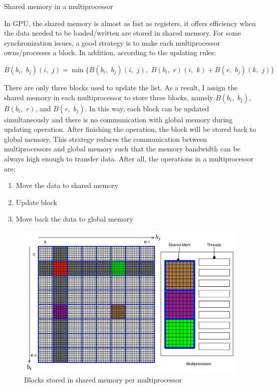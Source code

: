 \documentclass[12pt]{article}
\makeatletter
\renewenvironment{itemize}
{\list{$\bullet$}{\leftmargin\z@ \labelwidth\z@ \itemindent-\leftmargin
\let\makelabel\descriptionlabel}}
{\endlist}
\makeatother
\begin{document}
\begin{itemize}
    \newpage
    \item Shared memory in a multiprocessor
    \begin{flushleft}
        In GPU, the shared memory is almost as fast as registers, it offers efficiency when the data needed to be loaded/written are stored in shared memory. For some synchronization issues, a good strategy is to make each multiprocessor owns/processes a block. In addition, according to the updating rules:
        \begin{center}
            $B(b_i, \,\, b_j)(i, \,\, j) = \min\big\{B(b_i, \,\, b_j)(i, \,\, j), \,\, B(b_i, \,\, r)(i, \,\, k) + B(r, \,\, b_j)(k, \,\, j)\big\}$
        \end{center}
        There are only three blocks used to update the list.
        As a result, I assign the shared memory in each multiprocessor to store three blocks, namely $B(b_i, \,\, b_j)$, $B(b_i, \,\, r)$, and $B(r, \,\, b_j)$. In this way, each block can be updated simultaneously and there is no communication with global memory during updating operation. After finishing the operation, the block will be stored back to global memory. This strategy reduces the communication between  multiprocessors and global memory such that the memory bandwidth can be always high enough to transfer data. After all, the operations in a multiprocessor are:
        \begin{enumerate}
            \item Move the data to shared memory
            \item Update block
            \item Move back the data to global memory
        \end{enumerate}
    \end{flushleft}
    \begin{figure}[ht]
        \includegraphics[scale=.4]{./algo_per_block.png}
        \caption{Blocks stored in shared memory per multiprocessor}
    \end{figure}


\end{itemize}
\end{document}
